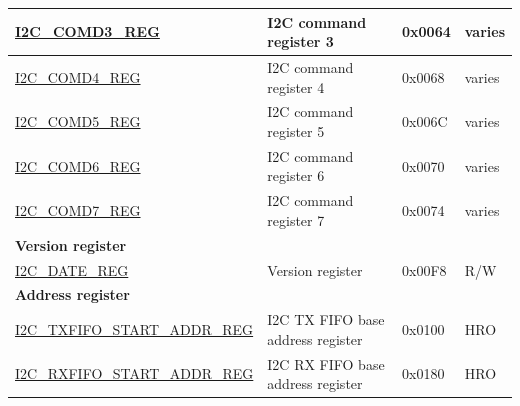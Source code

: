 \begin{longtable}{ | p{6cm} | p{7cm} | p{1.3cm} | p{1cm} | }
    \hyperref[regdesc:I2CCOMD3REG]{I2C\_COMD3\_REG} & I2C command register 3 & 0x0064 & varies \\ \hline
    \hyperref[regdesc:I2CCOMD4REG]{I2C\_COMD4\_REG} & I2C command register 4 & 0x0068 & varies \\ \hline
    \hyperref[regdesc:I2CCOMD5REG]{I2C\_COMD5\_REG} & I2C command register 5 & 0x006C & varies \\ \hline
    \hyperref[regdesc:I2CCOMD6REG]{I2C\_COMD6\_REG} & I2C command register 6 & 0x0070 & varies \\ \hline
    \hyperref[regdesc:I2CCOMD7REG]{I2C\_COMD7\_REG} & I2C command register 7 & 0x0074 & varies \\ \hline
    \multicolumn{4}{|l|}{\textbf{Version register}} \\ \hline
    \hyperref[regdesc:I2CDATEREG]{I2C\_DATE\_REG} & Version register & 0x00F8 & R/W \\ \hline
    \multicolumn{4}{|l|}{\textbf{Address register}} \\ \hline
    \hyperref[regdesc:I2CTXFIFOSTARTADDRREG]{I2C\_TXFIFO\_START\_ADDR\_REG} & I2C TX FIFO base address register & 0x0100 & HRO \\ \hline
    \hyperref[regdesc:I2CRXFIFOSTARTADDRREG]{I2C\_RXFIFO\_START\_ADDR\_REG} & I2C RX FIFO base address register & 0x0180 & HRO \\ \hline
    \end{longtable}
